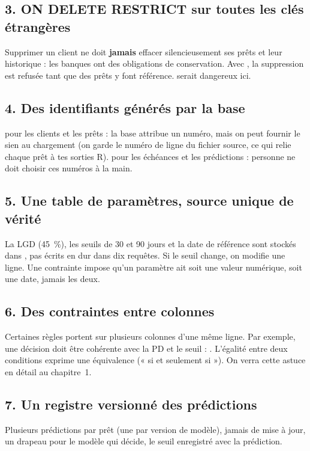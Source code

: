 \subsection*{3. ON DELETE RESTRICT sur toutes les clés étrangères}
Supprimer un client ne doit \textbf{jamais} effacer silencieusement ses prêts et leur historique : les
banques ont des obligations de conservation. Avec , la suppression est refusée tant que
des prêts y font référence.  serait dangereux ici.

\subsection*{4. Des identifiants générés par la base}
 pour les clients et les prêts : la base attribue un numéro,
mais on peut fournir le sien au chargement (on garde le numéro de ligne du fichier source, ce qui relie
chaque prêt à tes sorties R).  pour les échéances et les prédictions : personne
ne doit choisir ces numéros à la main.

\subsection*{5. Une table de paramètres, source unique de vérité}
La LGD (45~\%), les seuils de 30 et 90 jours et la date de référence sont stockés dans
, pas écrits en dur dans dix requêtes. Si le seuil change, on modifie une ligne.
Une contrainte impose qu'un paramètre ait soit une valeur numérique, soit une date, jamais les deux.

\subsection*{6. Des contraintes entre colonnes}
Certaines règles portent sur plusieurs colonnes d'une même ligne. Par exemple, une décision doit être
cohérente avec la PD et le seuil : .
L'égalité entre deux conditions exprime une équivalence (« si et seulement si »). On verra cette astuce
en détail au chapitre~1.

\subsection*{7. Un registre versionné des prédictions}
Plusieurs prédictions par prêt (une par version de modèle), jamais de mise à jour, un drapeau
 pour le modèle qui décide, le seuil enregistré avec la prédiction.

